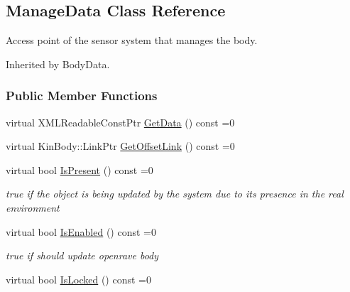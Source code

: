 \hypertarget{classOpenRAVE_1_1KinBody_1_1ManageData}{
\subsection{ManageData Class Reference}
\label{classOpenRAVE_1_1KinBody_1_1ManageData}
}


Access point of the sensor system that manages the body.  




Inherited by BodyData.

\subsubsection*{Public Member Functions}
\begin{DoxyCompactItemize}
\item 
virtual XMLReadableConstPtr \hyperlink{classOpenRAVE_1_1KinBody_1_1ManageData_aa6b2b0537af9c4f866af4d490825feb0}{GetData} () const =0
\item 
virtual KinBody::LinkPtr \hyperlink{classOpenRAVE_1_1KinBody_1_1ManageData_ad37372e87ef720bad3b3fb5a58b5daf5}{GetOffsetLink} () const =0
\item 
\hypertarget{classOpenRAVE_1_1KinBody_1_1ManageData_acd2229d4405249dbbbd772c9686409de}{
virtual bool \hyperlink{classOpenRAVE_1_1KinBody_1_1ManageData_acd2229d4405249dbbbd772c9686409de}{IsPresent} () const =0}
\label{classOpenRAVE_1_1KinBody_1_1ManageData_acd2229d4405249dbbbd772c9686409de}

\begin{DoxyCompactList}\small\item\em true if the object is being updated by the system due to its presence in the real environment \item\end{DoxyCompactList}\item 
\hypertarget{classOpenRAVE_1_1KinBody_1_1ManageData_ad39e678855b8c0b0d294b6d346396462}{
virtual bool \hyperlink{classOpenRAVE_1_1KinBody_1_1ManageData_ad39e678855b8c0b0d294b6d346396462}{IsEnabled} () const =0}
\label{classOpenRAVE_1_1KinBody_1_1ManageData_ad39e678855b8c0b0d294b6d346396462}

\begin{DoxyCompactList}\small\item\em true if should update openrave body \item\end{DoxyCompactList}\item 
\hypertarget{classOpenRAVE_1_1KinBody_1_1ManageData_ae7bc78361f30bfda0286c8af11392f2d}{
virtual bool \hyperlink{classOpenRAVE_1_1KinBody_1_1ManageData_ae7bc78361f30bfda0286c8af11392f2d}{IsLocked} () const =0}
\label{classOpenRAVE_1_1KinBody_1_1ManageData_ae7bc78361f30bfda0286c8af11392f2d}


\end{DoxyCompactItemize}

